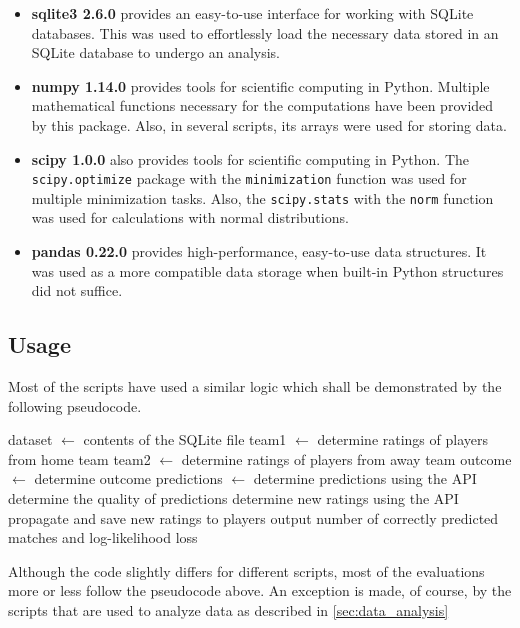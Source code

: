 \begin{itemize}
\item \textbf{sqlite3 2.6.0} provides an easy-to-use interface for working with SQLite databases. This was used to effortlessly load the necessary data stored in an SQLite database to undergo an analysis.

\item \textbf{numpy 1.14.0} provides tools for scientific computing in Python. Multiple mathematical functions necessary for the computations have been provided by this package. Also, in several scripts, its arrays were used for storing data.

\item \textbf{scipy 1.0.0} also provides tools for scientific computing in Python. The \texttt{scipy.optimize} package with the \texttt{minimization} function was used for multiple minimization tasks. Also, the \texttt{scipy.stats} with the  \texttt{norm} function was used for calculations with normal distributions.

\item \textbf{pandas 0.22.0} provides high-performance, easy-to-use data structures. It was used as a more compatible data storage when built-in Python structures did not suffice.
\end{itemize}

\subsection{Usage}
Most of the scripts have used a similar logic which shall be demonstrated by the following pseudocode.

\begin{algorithm}[H]
\begin{algorithmic}
\State dataset $\gets$ contents of the SQLite file
	\State team1 $\gets$ determine ratings of players from home team
	\State team2 $\gets$ determine ratings of players from away team
	\State outcome $\gets$ determine outcome
	\State
	\State predictions $\gets$ determine predictions using the API
	\State determine the quality of predictions
	\State
	\State determine new ratings using the API
	\State propagate and save new ratings to players
\EndWhile
\State output number of correctly predicted matches and log-likelihood loss
\end{algorithmic}
\end{algorithm}

Although the code slightly differs for different scripts, most of the evaluations more or less follow the pseudocode above. An exception is made, of course, by the scripts that are used to analyze data as described in \ref{sec:data_analysis}

